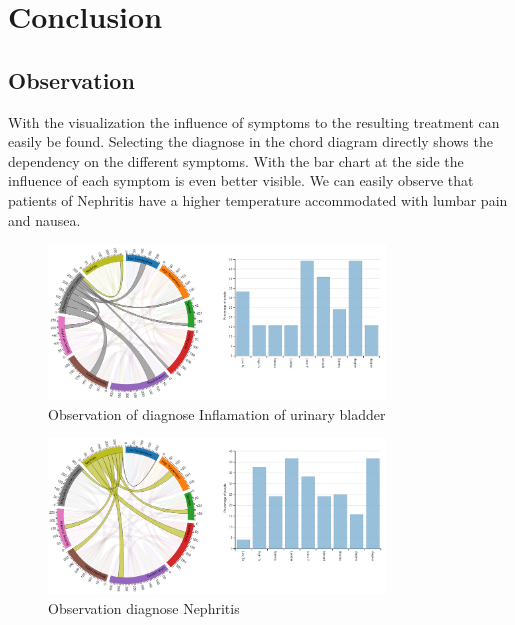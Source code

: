 \documentclass[a4paper,twoside,11pt]{article}
\begin{document}
\section{Conclusion}

\subsection{Observation}
With the visualization the influence of symptoms to the resulting treatment can easily be found. Selecting the diagnose in the chord diagram directly shows the dependency on the different symptoms. With the bar chart at the side the influence of each symptom is even better visible.
We can easily observe that patients of Nephritis have a higher temperature accommodated with lumbar pain and nausea.

\begin{figure}[h!]
\begin{center}
    \includegraphics[width=0.8\textwidth]{images/ObservationIoUB.PNG}
    \caption{Observation of diagnose Inflamation of urinary bladder}
    \label{fig:Chord}
\end{center}
\end{figure}

\begin{figure}[h!]
\begin{center}
    \includegraphics[width=0.8\textwidth]{images/ObservationNephritis.PNG}
    \caption{Observation diagnose Nephritis}
    \label{fig:Chord}
\end{center}
\end{figure}
\end{document}
